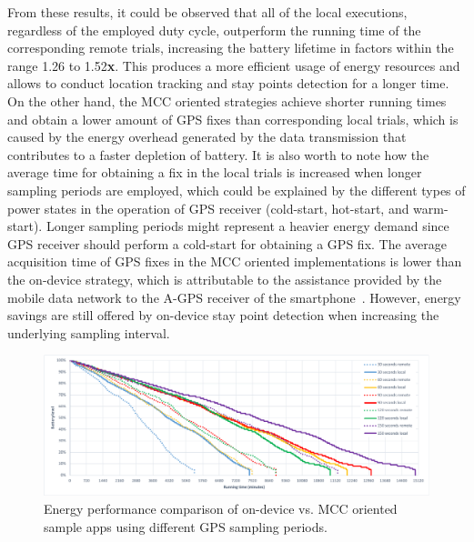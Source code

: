 \documentclass[ENG,PhD]{cinvestav}
\begin{document}
From these results, it could be observed that all of the local executions, regardless of the employed duty cycle, outperform the running time of the corresponding remote trials, increasing the battery lifetime in factors within the range 1.26 to 1.52\textbf{x}.
This produces a more efficient usage of energy resources and allows to conduct location tracking and stay points detection for a longer time.
On the other hand, the MCC oriented strategies achieve shorter running times and obtain a lower amount of GPS fixes than corresponding local trials, which is caused by the energy overhead generated by the data transmission that contributes to a faster depletion of battery.
It is also worth to note how the average time for obtaining a fix in the local trials is increased when longer sampling periods are employed, which could be explained by the different types of power states in the operation of GPS receiver (cold-start, hot-start, and warm-start).
Longer sampling periods might represent a heavier energy demand since GPS receiver should perform a cold-start for obtaining a GPS fix.
The average acquisition time of GPS fixes in the MCC oriented implementations is lower than the on-device strategy, which is attributable to the assistance provided by the mobile data network to the A-GPS receiver of the smartphone~\cite{Agarwal2002,Liu2012}.
However, energy savings are still offered by on-device stay point detection when increasing the underlying sampling interval.

\begin{figure}
  \centering
  \includegraphics[width=\columnwidth]{vectors/plot-energy-performance-r2}
  \caption{Energy performance comparison of on-device vs. MCC oriented sample apps using different GPS sampling periods.}
  \label{fig:plot-energy-performance}
\end{figure}
\end{document}
